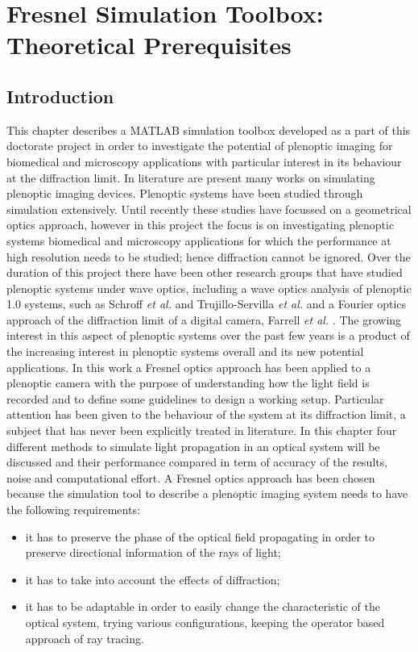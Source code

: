 \chapter{Fresnel Simulation Toolbox: Theoretical Prerequisites}
\label{chap:fresnel}
\section{Introduction}
\label{sec:intro}
This chapter describes a MATLAB simulation toolbox developed as a part of this doctorate project in order to investigate the potential of plenoptic imaging for biomedical and microscopy applications with particular interest in its behaviour at the diffraction limit. In literature are present many works on simulating plenoptic imaging devices. Plenoptic systems have been studied through simulation extensively. Until recently these studies have focussed on a geometrical optics approach, however in this project the focus is on investigating plenoptic systems biomedical and microscopy applications for which the performance at high resolution needs to be studied; hence diffraction cannot be ignored. Over the duration of this project there have been other research groups that have studied plenoptic systems under wave optics, including a wave optics analysis of plenoptic 1.0 systems, such as Schroff \textit{et al.} \cite{shroff2012high,shroff2013image} and Trujillo-Servilla \textit{et al.} \cite{birch2012depth} and a Fourier optics approach of the diffraction limit of a digital camera, Farrell \textit{et al.} \cite{farrell2012digital}. The growing interest in this aspect of plenoptic systems over the past few years is a product of the increasing interest in plenoptic systems overall and its new potential applications. In this work a Fresnel optics approach has been applied to a plenoptic camera with the purpose of understanding how the light field is recorded and to define some guidelines to design a working setup. Particular attention has been given to the behaviour of the system at its diffraction limit, a subject that has never been explicitly treated in literature. In this chapter four different methods to simulate light propagation in an optical system will be discussed and their performance compared in term of accuracy of the results, noise and computational effort.
A Fresnel optics approach has been chosen because the simulation tool to describe a plenoptic imaging system needs to have the following requirements:
\begin{itemize}
	\item it has to preserve the phase of the optical field propagating in order to preserve directional information of the rays of light;
	\item it has to take into account the effects of diffraction;
	\item it has to be adaptable in order to easily change the characteristic of the optical system, trying various configurations, keeping the operator based approach of ray tracing.
\end{itemize}
